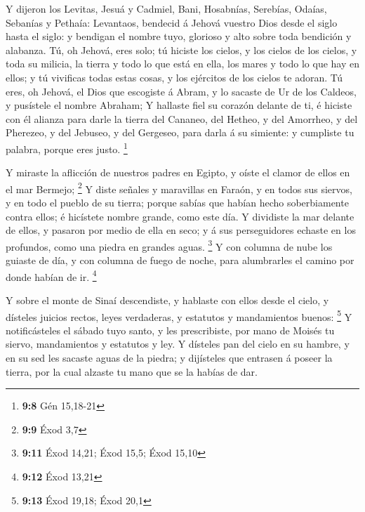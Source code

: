  Y dijeron los Levitas, Jesuá y Cadmiel, Bani, Hosabnías,
Serebías, Odaías, Sebanías y Pethaía: Levantaos, bendecid á Jehová
vuestro Dios desde el siglo hasta el siglo: y bendigan el nombre tuyo,
glorioso y alto sobre toda bendición y alabanza.  Tú, oh
Jehová, eres solo; tú hiciste los cielos, y los cielos de los cielos, y
toda su milicia, la tierra y todo lo que está en ella, los mares y todo
lo que hay en ellos; y tú vivificas todas estas cosas, y los ejércitos
de los cielos te adoran.  Tú eres, oh Jehová, el Dios que
escogiste á Abram, y lo sacaste de Ur de los Caldeos, y pusístele el
nombre Abraham;  Y hallaste fiel su corazón delante de ti, é
hiciste con él alianza para darle la tierra del Cananeo, del Hetheo, y
del Amorrheo, y del Pherezeo, y del Jebuseo, y del Gergeseo, para darla
á su simiente: y cumpliste tu palabra, porque eres justo. \footnote{\textbf{9:8}
  Gén 15,18-21}

 Y miraste la aflicción de nuestros padres en Egipto, y
oíste el clamor de ellos en el mar Bermejo; \footnote{\textbf{9:9} Éxod
  3,7}  Y diste señales y maravillas en Faraón, y en todos
sus siervos, y en todo el pueblo de su tierra; porque sabías que habían
hecho soberbiamente contra ellos; é hicístete nombre grande, como este
día.  Y dividiste la mar delante de ellos, y pasaron por
medio de ella en seco; y á sus perseguidores echaste en los profundos,
como una piedra en grandes aguas. \footnote{\textbf{9:11} Éxod 14,21;
  Éxod 15,5; Éxod 15,10}  Y con columna de nube los guiaste
de día, y con columna de fuego de noche, para alumbrarles el camino por
donde habían de ir. \footnote{\textbf{9:12} Éxod 13,21}

 Y sobre el monte de Sinaí descendiste, y hablaste con
ellos desde el cielo, y dísteles juicios rectos, leyes verdaderas, y
estatutos y mandamientos buenos: \footnote{\textbf{9:13} Éxod 19,18;
  Éxod 20,1}  Y notificásteles el sábado tuyo santo, y les
prescribiste, por mano de Moisés tu siervo, mandamientos y estatutos y
ley.  Y dísteles pan del cielo en su hambre, y en su sed
les sacaste aguas de la piedra; y dijísteles que entrasen á poseer la
tierra, por la cual alzaste tu mano que se la habías de dar.

